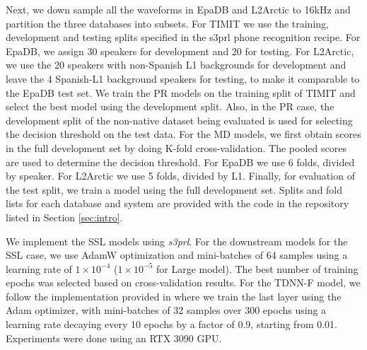 \documentclass{INTERSPEECH2023}
\begin{document}
Next, we down sample all the waveforms in EpaDB and L2Arctic to 16kHz and partition the three databases into subsets. For TIMIT we use the training, development and testing splits specified in the s3prl phone recognition recipe. For EpaDB, we assign 30 speakers for development and 20 for testing. For L2Arctic, we use the 20 speakers with non-Spanish L1 backgrounds for development and leave the 4 Spanish-L1 background speakers for testing, to make it comparable to the EpaDB test set.
We train the PR models on the training split of TIMIT and select the best model using the development split. Also, in the PR case, the development split of the non-native dataset being evaluated is used for selecting the decision threshold on the test data. For the MD models, we first obtain scores in the full development set by doing K-fold cross-validation. The pooled scores are used to determine the decision threshold. For EpaDB we use 6 folds, divided by speaker. For L2Arctic we use 5 folds, divided by L1. Finally, for evaluation of the test split, we train a model using the full development set. Splits and fold lists for each database and system are provided with the code in the repository listed in Section \ref{sec:intro}. 
 
We implement the SSL models using \emph{s3prl}. For the downstream models for the SSL case, we use AdamW optimization and mini-batches of 64 samples using a learning rate of $1\times10^{-4}$ ($1\times10^{-5}$ for Large model). The best number of training epochs was selected based on cross-validation results. For the TDNN-F model, we follow the implementation provided in \cite{sancinetti2022transfer} where we train the last layer using the Adam optimizer, with mini-batches of 32 samples over 300 epochs using a learning rate decaying every 10 epochs by a factor of 0.9, starting from 0.01. Experiments were done using an RTX 3090 GPU. 
\end{document}
